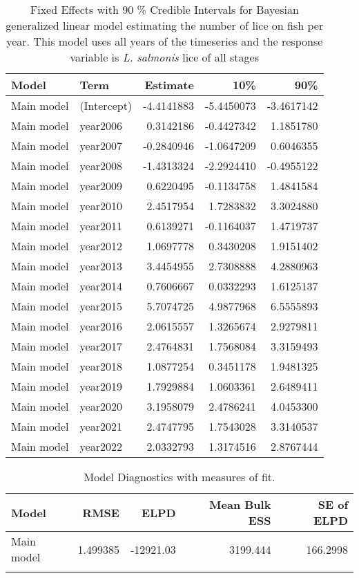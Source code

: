 \begin{table}
\centering
\caption{Fixed Effects with 90 \% Credible Intervals for Bayesian
    generalized linear model estimating the number of lice on fish per year.
    This model uses all years of the timeseries and the response
    variable is \textit{L. salmonis} lice of all stages}
\centering
\begin{tabular}[t]{llrrr}
\toprule
Model & Term & Estimate & 10\% & 90\%\\
\midrule
Main model & (Intercept) & -4.4141883 & -5.4450073 & -3.4617142\\
Main model & year2006 & 0.3142186 & -0.4427342 & 1.1851780\\
Main model & year2007 & -0.2840946 & -1.0647209 & 0.6046355\\
Main model & year2008 & -1.4313324 & -2.2924410 & -0.4955122\\
Main model & year2009 & 0.6220495 & -0.1134758 & 1.4841584\\
\addlinespace
Main model & year2010 & 2.4517954 & 1.7283832 & 3.3024880\\
Main model & year2011 & 0.6139271 & -0.1164037 & 1.4719737\\
Main model & year2012 & 1.0697778 & 0.3430208 & 1.9151402\\
Main model & year2013 & 3.4454955 & 2.7308888 & 4.2880963\\
Main model & year2014 & 0.7606667 & 0.0332293 & 1.6125137\\
\addlinespace
Main model & year2015 & 5.7074725 & 4.9877968 & 6.5555893\\
Main model & year2016 & 2.0615557 & 1.3265674 & 2.9279811\\
Main model & year2017 & 2.4764831 & 1.7568084 & 3.3159493\\
Main model & year2018 & 1.0877254 & 0.3451178 & 1.9481325\\
Main model & year2019 & 1.7929884 & 1.0603361 & 2.6489411\\
\addlinespace
Main model & year2020 & 3.1958079 & 2.4786241 & 4.0453300\\
Main model & year2021 & 2.4747795 & 1.7543028 & 3.3140537\\
Main model & year2022 & 2.0332793 & 1.3174516 & 2.8767444\\
\bottomrule
\end{tabular}
\label{SI-leps-all-fixef}
\end{table}

\begin{table}
\centering
\caption{Model Diagnostics with measures of fit.}
\centering
\begin{tabular}[t]{lrrrr}
\toprule
Model & RMSE & ELPD & Mean Bulk ESS & SE of ELPD\\
\midrule
Main model & 1.499385 & -12921.03 & 3199.444 & 166.2998\\
\bottomrule
\label{SI-leps-all-diags-1}
\end{tabular}
\end{table}

